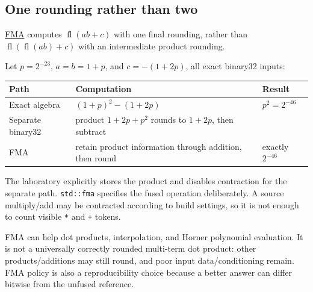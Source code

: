 \subsection{One rounding rather than two}\label{01-foundations-i-ch001-one-rounding-rather-than-two}

\hyperref[appendix-41e8ef22a21e]{FMA} computes \(\operatorname{fl}(ab+c)\) with one final rounding, rather than \(\operatorname{fl}(\operatorname{fl}(ab)+c)\) with an intermediate product rounding.

Let \(p=2^{-23}\), \(a=b=1+p\), and \(c=-(1+2p)\), all exact binary32 inputs:

{\def\LTcaptype{none} %
\begin{longtable}[]{@{}
  >{\raggedright\arraybackslash}p{}
  >{\raggedright\arraybackslash}p{}
  >{\raggedright\arraybackslash}p{}@{}}
\toprule\noalign{}
\begin{minipage}[b]{\linewidth}\raggedright
Path
\end{minipage} & \begin{minipage}[b]{\linewidth}\raggedright
Computation
\end{minipage} & \begin{minipage}[b]{\linewidth}\raggedright
Result
\end{minipage} \\
\midrule\noalign{}
\endhead
\bottomrule\noalign{}
\endlastfoot
Exact algebra & \((1+p)^2-(1+2p)\) & \(p^2=2^{-46}\) \\
Separate binary32 & product \(1+2p+p^2\) rounds to \(1+2p\), then subtract & 0 \\
FMA & retain product information through addition, then round & exactly \(2^{-46}\) \\
\end{longtable}
}

The laboratory explicitly stores the product and disables contraction for the separate path. \texttt{std::fma} specifies the fused operation deliberately. A source multiply/add may be contracted according to build settings, so it is not enough to count visible \texttt{*} and \texttt{+} tokens.

FMA can help dot products, interpolation, and Horner polynomial evaluation. It is not a universally correctly rounded multi-term dot product: other products/additions may still round, and poor input data/conditioning remain. FMA policy is also a reproducibility choice because a better answer can differ bitwise from the unfused reference.

